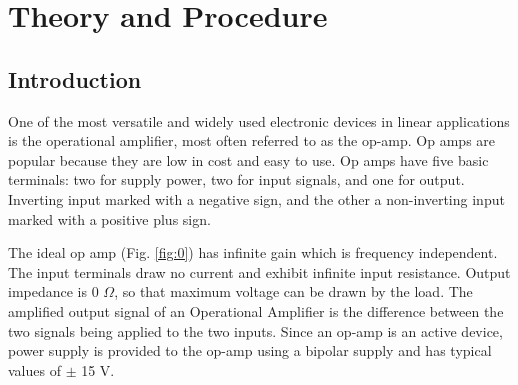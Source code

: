 \section{Theory and Procedure}






\subsection*{Introduction}

One of the most versatile and widely used electronic devices in linear applications is the operational amplifier, most often referred to as the op-amp. Op amps are popular because they are low in cost and easy to use. Op amps have five basic terminals: two for supply power, two for input signals, and one for output. Inverting input marked with a negative sign, and the other a non-inverting input marked with a positive plus sign.

The ideal op amp (Fig. \ref{fig:0}) has infinite gain which is frequency independent. The input terminals draw no current and exhibit infinite input resistance. Output impedance is 0 $\Omega$, so that maximum voltage can be drawn by the load.
The amplified output signal of an Operational Amplifier is the difference between the two signals being applied to the two inputs. Since an op-amp is an active device,  power supply is provided to the op-amp using a bipolar supply and has typical values of $\pm$ 15 V.


